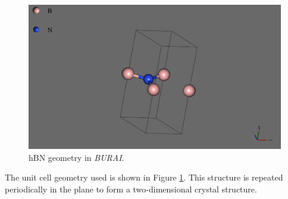 \documentclass[]{article}
\begin{document}
\begin{figure}[H]
	\centering
	\includegraphics[width = \textwidth]{hbn_geometry.PNG}
	\caption{hBN geometry in \textit{BURAI}.}
	\label{fig: hBN_geometry}
\end{figure}

The unit cell geometry used is shown in Figure \ref{fig: hBN_geometry}. This structure is repeated periodically in the plane to form a two-dimensional crystal structure.
\end{document}
